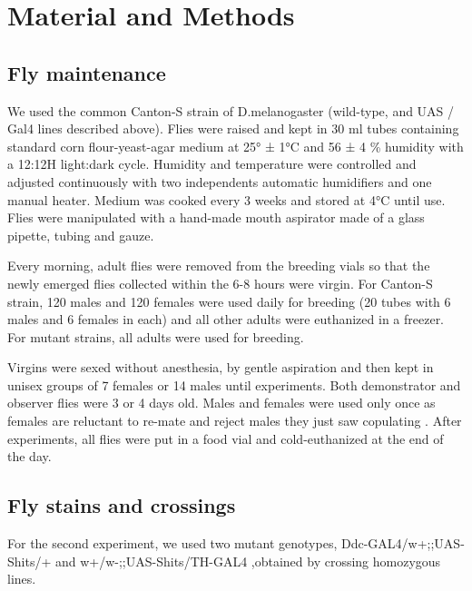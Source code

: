 \documentclass[a4paper, 12pt]{article}
\begin{document}
	
	

	
	\clearpage
	\section{Material and Methods}
	
	\bigskip

	\subsection{Fly maintenance}
	
	We used the common Canton-S strain of D.melanogaster (wild-type, and UAS / Gal4 lines described above). Flies were raised and kept in 30 ml tubes containing standard corn flour-yeast-agar medium at 25° ± 1°C and 56 ± 4 \% humidity with a 12:12H light:dark cycle. Humidity and temperature were controlled and adjusted continuously with two independents automatic humidifiers and one manual heater. Medium was cooked every 3 weeks and stored at 4°C until use. Flies were manipulated with a hand-made mouth aspirator made of a glass pipette, tubing and gauze.
	
	Every morning, adult flies were removed from the breeding vials so that the newly emerged flies collected within the 6-8 hours were virgin. For Canton-S strain, 120 males and 120 females were used daily for breeding (20 tubes with 6 males and 6 females in each) and all other adults were euthanized in a freezer. For mutant strains, all adults were used for breeding. 
	
	Virgins were sexed without anesthesia, by gentle aspiration and then kept in unisex groups of 7 females or 14 males until experiments. Both demonstrator and observer flies were 3 or 4 days old. Males and females were used only once as females are reluctant to re-mate \parencite{chapman_sex_2003} and reject males they just saw copulating \parencite{loyau_when_2012}. After experiments, all flies were put in a food vial and cold-euthanized at the end of the day.
	
	\subsection{Fly stains and crossings}
	
	For the second experiment, we used two mutant genotypes, Ddc-GAL4/w+;;UAS-Shits/+ and w+/w-;;UAS-Shits/TH-GAL4 ,obtained by crossing homozygous lines. 
	
\end{document}

